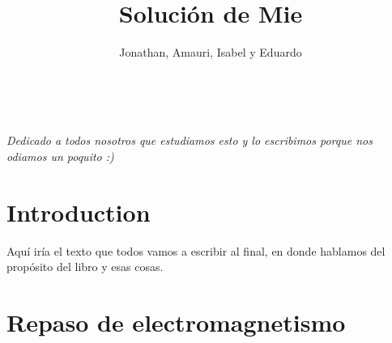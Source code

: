 \documentclass[12pts,a4paper]{book}
\title{Solución de Mie}
\author{Jonathan, Amauri, Isabel y Eduardo}
\begin{document}
\frontmatter

\blankpage

\maketitle



\tableofcontents

\listoffigures

\listoftables

\cleardoublepage
~\vfill
\begin{doublespace}
\noindent\fontsize{18}{22}\selectfont\itshape
\noindent
Dedicado a todos nosotros que estudiamos esto y lo escribimos porque nos odiamos un poquito :)
\end{doublespace}
\vfill
\vfill


\cleardoublepage
\chapter*{Introduction}

Aquí iría el texto que todos vamos a escribir al final, en donde hablamos del propósito del libro y esas cosas.


\mainmatter


\chapter{Repaso de electromagnetismo}
\label{ch:repasoEM} %




\end{document}
